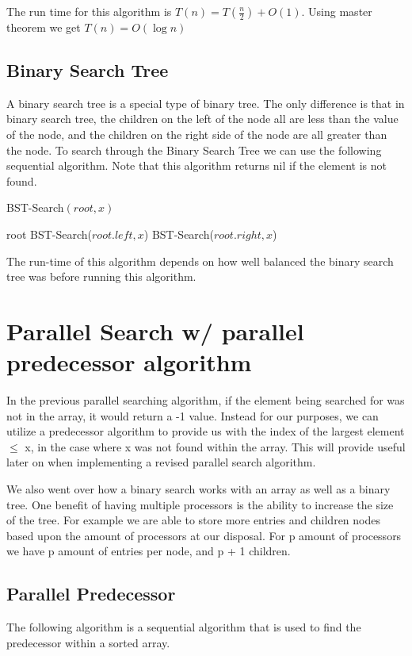 \documentclass[11pt]{article}
\begin{document}
The run time for this algorithm is $T(n) = T(\frac{n}{2}) + O(1)$. Using master theorem we get $T(n) = O(\log n)$


\subsection{Binary Search Tree}
A binary search tree is a special type of binary tree. The only difference is that in binary search tree, the children on the left of the node all are less than the value of the node, and the children on the right side of the node are all greater than the node. To search through the Binary Search Tree we can use the following sequential algorithm. Note that this algorithm returns nil if the element is not found.

\begin{algorithm}
\caption{BST-Search$(root,x)$}
\begin{algorithmic}
    \RETURN root
    \RETURN BST-Search($root.left,x$)
\ELSE
    \RETURN BST-Search($root.right,x$)
\ENDIF
\end{algorithmic}
\end{algorithm}

The run-time of this algorithm depends on how well balanced the binary search tree was before running this algorithm.

\section{Parallel Search w/ parallel predecessor algorithm}
In the previous parallel searching algorithm, if the element being searched for was not in the array, it would return a -1 value. Instead for our purposes, we can utilize a predecessor algorithm to provide us with the index of the largest element $\leq$ x, in the case where x was not found within the array. This will provide useful later on when implementing a revised parallel search algorithm.

We also went over how a binary search works with an array as well as a binary tree. One benefit of having multiple processors is the ability to increase the size of the tree. For example we are able to store more entries and children nodes based upon the amount of processors at our disposal. For p amount of processors we have p amount of entries per node, and p + 1 children.

\subsection{Parallel Predecessor}
 The following algorithm is a sequential algorithm that is used to find the predecessor within a sorted array.
\end{document}
